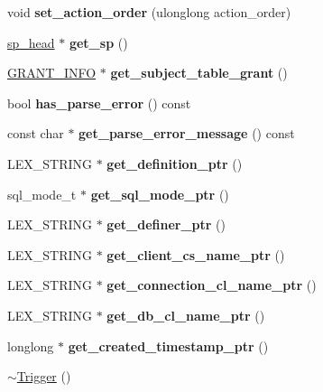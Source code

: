 \begin{DoxyCompactItemize}
void {\bfseries set\+\_\+action\+\_\+order} (ulonglong action\+\_\+order)
\item 
\mbox{\label{classTrigger_a42d61e307f370ffb445fd186a862ca11}} 
\mbox{\hyperlink{classsp__head}{sp\+\_\+head}} $\ast$ {\bfseries get\+\_\+sp} ()
\item 
\mbox{\label{classTrigger_a0a9faa31596c228f4fbc4aae9bcdfaae}} 
\mbox{\hyperlink{structGRANT__INFO}{G\+R\+A\+N\+T\+\_\+\+I\+N\+FO}} $\ast$ {\bfseries get\+\_\+subject\+\_\+table\+\_\+grant} ()
\item 
\mbox{\label{classTrigger_a06e3096775c18e635393bd1c09f80ea0}} 
bool {\bfseries has\+\_\+parse\+\_\+error} () const
\item 
\mbox{\label{classTrigger_a752ae4794950091270d66dce4ee6490a}} 
const char $\ast$ {\bfseries get\+\_\+parse\+\_\+error\+\_\+message} () const
\item 
\mbox{\label{classTrigger_ab4b649fa67232394610bd5f9fb0e543c}} 
L\+E\+X\+\_\+\+S\+T\+R\+I\+NG $\ast$ {\bfseries get\+\_\+definition\+\_\+ptr} ()
\item 
\mbox{\label{classTrigger_ada94c2604e2b411f76b987bada222d4b}} 
sql\+\_\+mode\+\_\+t $\ast$ {\bfseries get\+\_\+sql\+\_\+mode\+\_\+ptr} ()
\item 
\mbox{\label{classTrigger_ab8ff5bd25d68851e5b774b0454720ea9}} 
L\+E\+X\+\_\+\+S\+T\+R\+I\+NG $\ast$ {\bfseries get\+\_\+definer\+\_\+ptr} ()
\item 
\mbox{\label{classTrigger_a4075a8e079b4db13cb46b121be56ea60}} 
L\+E\+X\+\_\+\+S\+T\+R\+I\+NG $\ast$ {\bfseries get\+\_\+client\+\_\+cs\+\_\+name\+\_\+ptr} ()
\item 
\mbox{\label{classTrigger_a2537db4778a0619dd2f39bc46671058a}} 
L\+E\+X\+\_\+\+S\+T\+R\+I\+NG $\ast$ {\bfseries get\+\_\+connection\+\_\+cl\+\_\+name\+\_\+ptr} ()
\item 
\mbox{\label{classTrigger_ae85c2b698b7b2ea194f73122d3d330e0}} 
L\+E\+X\+\_\+\+S\+T\+R\+I\+NG $\ast$ {\bfseries get\+\_\+db\+\_\+cl\+\_\+name\+\_\+ptr} ()
\item 
\mbox{\label{classTrigger_a9815370b84082ea19bf0eaf04f93509c}} 
longlong $\ast$ {\bfseries get\+\_\+created\+\_\+timestamp\+\_\+ptr} ()
\item 
\mbox{\hyperlink{classTrigger_a1a2d107dd06737f51c81c4897c75e59d}{$\sim$\+Trigger}} ()
\end{DoxyCompactItemize}
